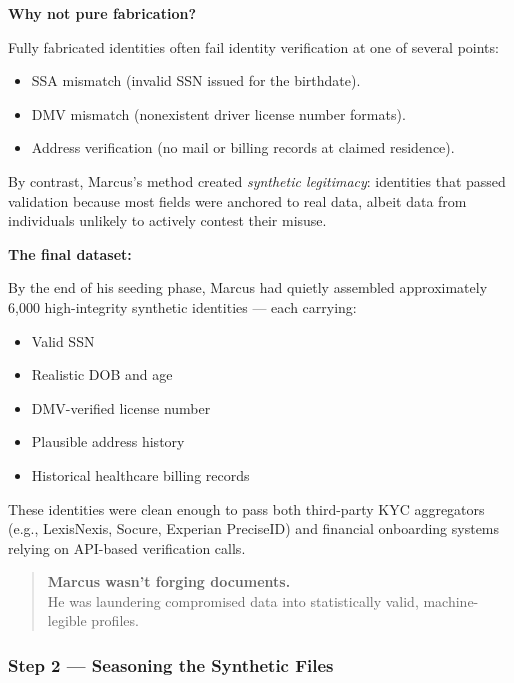 \medskip

\textbf{Why not pure fabrication?}

Fully fabricated identities often fail identity verification at one of several points:

\begin{itemize}
    \item SSA mismatch (invalid SSN issued for the birthdate).
    \item DMV mismatch (nonexistent driver license number formats).
    \item Address verification (no mail or billing records at claimed residence).
\end{itemize}

By contrast, Marcus’s method created \emph{synthetic legitimacy}: identities that passed validation because most fields were anchored to real data, albeit data from individuals unlikely to actively contest their misuse.

\medskip

\textbf{The final dataset:}

By the end of his seeding phase, Marcus had quietly assembled approximately 6,000 high-integrity synthetic identities --- each carrying:

\begin{itemize}
    \item Valid SSN
    \item Realistic DOB and age
    \item DMV-verified license number
    \item Plausible address history
    \item Historical healthcare billing records
\end{itemize}

These identities were clean enough to pass both third-party KYC aggregators (e.g., LexisNexis, Socure, Experian PreciseID) and financial onboarding systems relying on API-based verification calls.

\begin{quote}
\textbf{Marcus wasn’t forging documents.} \\
He was laundering compromised data into statistically valid, machine-legible profiles.
\end{quote}


\medskip

\subsubsection*{Step 2 --- Seasoning the Synthetic Files}

